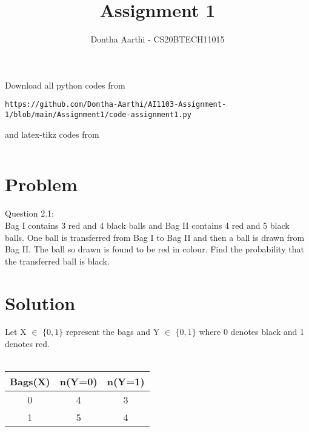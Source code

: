 \documentclass[journal,12pt,twocolumn]{IEEEtran}
\begin{document}
     \def\rightbox#1{\makebox[0in][r]{#1}}
     \def\centbox#1{\makebox[0in]{#1}}
     \def\topbox#1{\raisebox{-\baselineskip}[0in][0in]{#1}}
     \def\midbox#1{\raisebox{-0.5\baselineskip}[0in][0in]{#1}}
\vspace{3cm}
\title{Assignment 1}
\author{Dontha Aarthi - CS20BTECH11015}
\maketitle
\newpage
\bigskip
\renewcommand{\thefigure}{\theenumi}
\renewcommand{\thetable}{\theenumi}
Download all python codes from 
\begin{lstlisting}
https://github.com/Dontha-Aarthi/AI1103-Assignment-1/blob/main/Assignment1/code-assignment1.py
\end{lstlisting}
%
and latex-tikz codes from 
%
\begin{lstlisting}

\end{lstlisting}
\section{Problem}
Question 2.1:\\
Bag I contains 3 red and 4 black balls and
Bag II contains 4 red and 5 black balls. One
ball is transferred from Bag I to Bag II and
then a ball is drawn from Bag II. The ball
so drawn is found to be red in colour. Find
the probability that the transferred ball is black.


\section{Solution}

Let X $\in$ $ \{0,1\} $ represent the bags and Y $\in$ $\{0,1\}$ where 0 denotes black and 1 denotes red.\\\\
\begin{centre}
 \begin{tabular}{|c|c|c|}
    \hline
    Bags(X) & n(Y=0) & n(Y=1)  \\
    \hline
     0 & 4 & 3\\
    \hline
     1 & 5 & 4\\
     \hline
 \end{tabular}
\end{centre}
\end{document}
